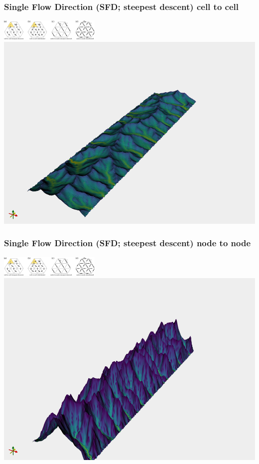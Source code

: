 \documentclass[aspectratio=169]{beamer}
\begin{document}
\begin{frame}
    \frametitle{Single Flow Direction (SFD; steepest descent) cell to cell}
    \centering
    \includegraphics[height=1cm]{./figures/MFDandSFD.png}
    \includegraphics[height=0.8\paperheight]{./figures/flem-sfd-c2c.png}
\end{frame}

\begin{frame}
    \frametitle{Single Flow Direction (SFD; steepest descent) node to node}
    \centering
    \includegraphics[height=1cm]{./figures/MFDandSFD.png}
    \includegraphics[height=0.8\paperheight]{./figures/flem-sfd-n2n.png}
\end{frame}
\end{document}

